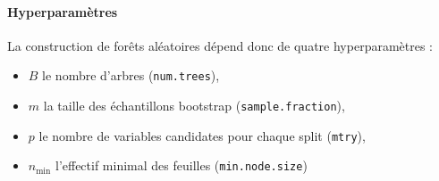 \paragraph{Hyperparamètres}
La construction de forêts aléatoires dépend donc de quatre hyperparamètres : 
\begin{itemize}
	\item $B$ le nombre d'arbres (\texttt{num.trees}),
	\item $m$ la taille des échantillons bootstrap (\texttt{sample.fraction}),
	\item $p$ le nombre de variables candidates pour chaque split (\texttt{mtry}),
	\item $n_{\min}$ l'effectif minimal des feuilles (\texttt{min.node.size})
\end{itemize}  